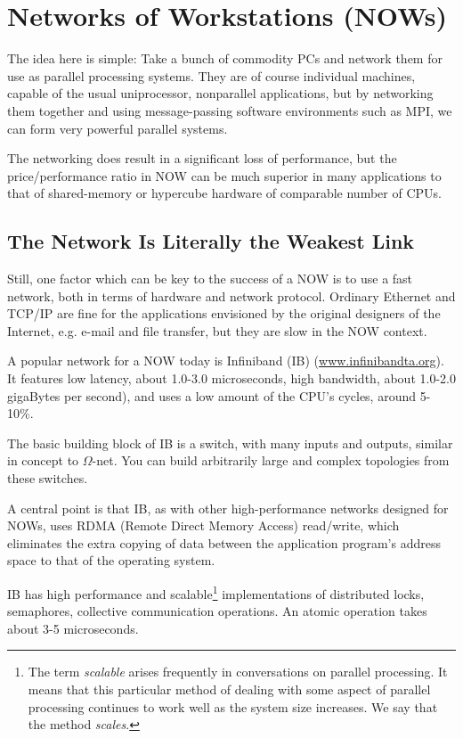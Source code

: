 \section{Networks of Workstations (NOWs)}

The idea here is simple:  Take a bunch of commodity PCs and network them
for use as parallel processing systems. They are of course individual
machines, capable of the usual uniprocessor, nonparallel applications,
but by networking them together and using message-passing software
environments such as MPI, we can form very powerful parallel systems.

The networking does result in a significant loss of performance, but the
price/performance ratio in NOW can be much superior in many applications
to that of shared-memory or hypercube hardware of comparable number of
CPUs.

\subsection{The Network Is Literally the Weakest Link}

Still, one factor which can be key to the success of a NOW is to use a
fast network, both in terms of hardware and network protocol.  Ordinary
Ethernet and TCP/IP are fine for the applications envisioned by the
original designers of the Internet, e.g. e-mail and file transfer, but
they are slow in the NOW context.  

A popular network for a NOW today is Infiniband (IB)
(\url{www.infinibandta.org}).  It features low latency, about 1.0-3.0
microseconds, high bandwidth, about 1.0-2.0 gigaBytes per second), and
uses a low amount of the CPU's cycles, around 5-10\%.  

The basic building block of IB is a switch, with many inputs and
outputs, similar in concept to $\Omega$-net.  You can build arbitrarily
large and complex topologies from these switches.

A central point is that IB, as with other high-performance networks
designed for NOWs, uses RDMA (Remote Direct Memory Access) read/write,
which eliminates the extra copying of data between the application
program's address space to that of the operating system.

IB has high performance and scalable\footnote{The term {\it
scalable} arises frequently in conversations on parallel processing.  It
means that this particular method of dealing with some aspect of
parallel processing continues to work well as the system size increases.
We say that the method {\it scales}.} implementations of distributed
locks, semaphores, collective communication operations.  An atomic
operation takes about 3-5 microseconds.

